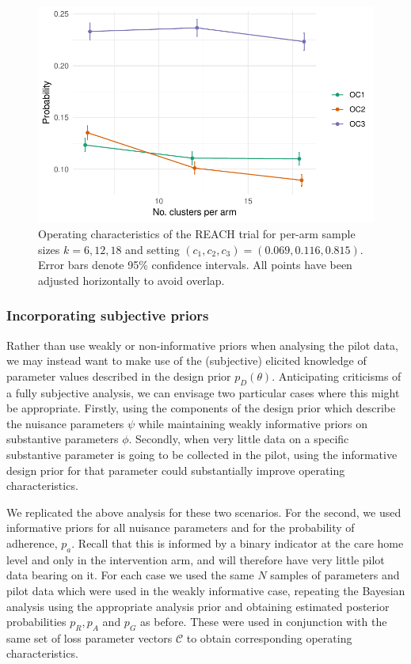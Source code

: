 \documentclass[AMA,STIX1COL]{WileyNJD-v2}
\begin{document}
\begin{figure}
\centering
\includegraphics[scale=0.8]{./figures/k_comp}
\caption{Operating characteristics of the REACH trial for per-arm sample sizes $k = 6, 12, 18$ and setting $(c_1, c_2, c_3) = (0.069, 0.116, 0.815)$. Error bars denote 95\% confidence intervals. All points have been adjusted horizontally to avoid overlap.}
\label{fig:k_comp}
\end{figure}

\subsubsection{Incorporating subjective priors}

Rather than use weakly or non-informative priors when analysing the pilot data, we may instead want to make use of the (subjective) elicited knowledge of parameter values described in the design prior $p_D(\theta)$. Anticipating criticisms of a fully subjective analysis, we can envisage two particular cases where this might be appropriate. Firstly, using the components of the design prior which describe the nuisance parameters $\psi$ while maintaining weakly informative priors on substantive parameters $\phi$. Secondly, when very little data on a specific substantive parameter is going to be collected in the pilot, using the informative design prior for that parameter could substantially improve operating characteristics.

We replicated the above analysis for these two scenarios. For the second, we used informative priors for all nuisance parameters and for the probability of adherence, $p_a$. Recall that this is informed by a binary indicator at the care home level and only in the intervention arm, and will therefore have very little pilot data bearing on it. For each case we used the same $N$ samples of parameters and pilot data which were used in the weakly informative case, repeating the Bayesian analysis using the appropriate analysis prior and obtaining estimated posterior probabilities $p_R, p_A$ and $p_G$ as before. These were used in conjunction with the same set of loss parameter vectors $\mathcal{C}$ to obtain corresponding operating characteristics.
\end{document}
